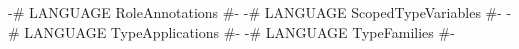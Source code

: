 \begin{code}
{-# LANGUAGE RoleAnnotations     #-}
{-# LANGUAGE ScopedTypeVariables #-}
{-# LANGUAGE TypeApplications    #-}
{-# LANGUAGE TypeFamilies        #-}
\end{code}
